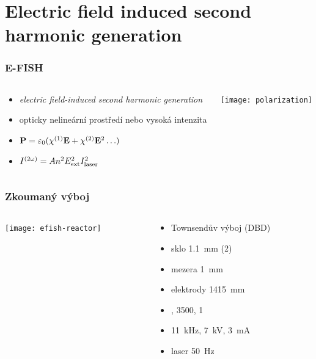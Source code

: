 \documentclass[10pt]{beamer}
\newcommand\epol{P}
\newcommand\esus{\chi}
\newcommand\esusn[1]{\esus^{(#1)}}
\newcommand\eper{\varepsilon}
\newcommand\epervac{\eper_0}
\newcommand\elfieldext{E_\text{ext}}
\newcommand\efishconst{A}
\newcommand\itylaser{I_\text{laser}}
\begin{document}
\section[E-FISH]{Electric field induced second harmonic generation}

\begin{frame}
	\frametitle{E-FISH}
	\begin{columns}
	\begin{column}{0.5\textwidth}
		\begin{itemize}
			\item \emph{electric field-induced second harmonic generation}
			\item opticky nelineární prostředí nebo vysoká intenzita
			\item $\vec\epol = \epervac (\esusn1\vec\elfield + \esusn2\vec\elfield^2
				\ldots)$
			\item $\efish = \efishconst \ndens^2 \elfieldext^2 \itylaser^2$
		\end{itemize}
	\end{column}
	\begin{column}{0.5\textwidth}
		\texttt{[image: polarization]}
	\end{column}
	\end{columns}
\end{frame}

\begin{frame}
	\frametitle{Zkoumaný výboj}
	\begin{columns}
	\begin{column}{0.6\textwidth}
		\texttt{[image: efish-reactor]}
		\graphicspath{{../efish/}}
		
	\end{column}
	\begin{column}{0.4\textwidth}
		\begin{itemize}
			\item Townsendův výboj (DBD)
			\item sklo \SI{1.1}{\milli\metre} (2\times)
			\item mezera \SI{1}{\milli\metre}
			\item elektrody \num{14}\times\SI{15}{\milli\metre}
			\item {}, \SI{3500}{\sccm}, \SI{1}{\atmosphere}
			\item \SI{11}{\kilo\hertz}, \SI{7}{\kilo\volt},
				\SI{3}{\milli\ampere}
			\item laser \SI{50}{\hertz}
		\end{itemize}
	\end{column}
	\end{columns}
\end{frame}
\end{document}
